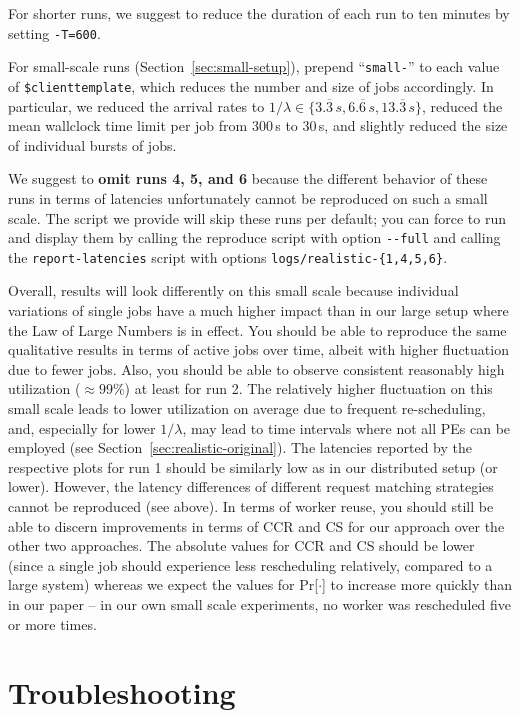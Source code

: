\documentclass[runningheads]{article}
\numberwithin{dummy}{subsection}
\begin{document}
For shorter runs, we suggest to reduce the duration of each run to ten minutes by setting \texttt{-T=600}.

For small-scale runs (Section~\ref{sec:small-setup}), prepend ``\texttt{small-}'' to each value of \texttt{\$clienttemplate}, which reduces the number and size of jobs accordingly.
In particular, we reduced the arrival rates to $1/\lambda \in \{3.\overline{3}\,s, 6.\overline{6}\,s, 13.\overline{3}\,s\}$, reduced the mean wallclock time limit per job from 300\,s to 30\,s, and slightly reduced the size of individual bursts of jobs.

We suggest to \textbf{omit runs 4, 5, and 6} because the different behavior of these runs in terms of latencies unfortunately cannot be reproduced on such a small scale.
The script we provide will skip these runs per default; you can force to run and display them by calling the reproduce script with option \texttt{-{}-full} and calling the \texttt{report-latencies} script with options \texttt{logs/realistic-\{1,4,5,6\}}.

Overall, results will look differently on this small scale because individual variations of single jobs have a much higher impact than in our large setup where the Law of Large Numbers is in effect.
You should be able to reproduce the same qualitative results in terms of active jobs over time, albeit with higher fluctuation due to fewer jobs.
Also, you should be able to observe consistent reasonably high utilization ($\approx 99\%$) at least for run 2.
The relatively higher fluctuation on this small scale leads to lower utilization on average due to frequent re-scheduling, and, especially for lower $1/\lambda$, may lead to time intervals where not all PEs can be employed (see Section~\ref{sec:realistic-original}).
The latencies reported by the respective plots for run 1 should be similarly low as in our distributed setup (or lower).
However, the latency differences of different request matching strategies cannot be reproduced (see above).
In terms of worker reuse, you should still be able to discern improvements in terms of CCR and CS for our approach over the other two approaches.
The absolute values for CCR and CS should be lower (since a single job should experience less rescheduling relatively, compared to a large system) whereas we expect the values for Pr[$\cdot$] to increase more quickly than in our paper -- in our own small scale experiments, no worker was rescheduled five or more times.

\section{Troubleshooting}
\end{document}
